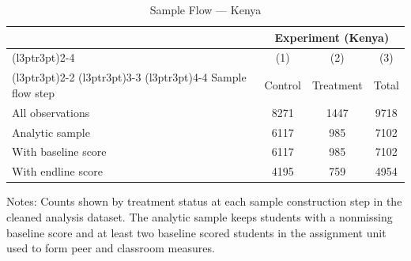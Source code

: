 \begin{table}[H]
\centering
\caption{Sample Flow --- Kenya}
\label{tab:ke_sampleflow}
\begin{threeparttable}
\begin{tabular}[t]{lccc}
\toprule
\multicolumn{1}{c}{ } & \multicolumn{3}{c}{Experiment (Kenya)} \\
\cmidrule(l{3pt}r{3pt}){2-4}
\multicolumn{1}{c}{ } & \multicolumn{1}{c}{(1)} & \multicolumn{1}{c}{(2)} & \multicolumn{1}{c}{(3)} \\
\cmidrule(l{3pt}r{3pt}){2-2} \cmidrule(l{3pt}r{3pt}){3-3} \cmidrule(l{3pt}r{3pt}){4-4}
Sample flow step & Control & Treatment & Total \\
\midrule
All observations & 8271 & 1447 & 9718 \\
Analytic sample & 6117 & 985 & 7102 \\
With baseline score & 6117 & 985 & 7102 \\
With endline score & 4195 & 759 & 4954 \\
\bottomrule
\end{tabular}
\begin{tablenotes}[para]
\item Notes: Counts shown by treatment status at each sample construction step in the cleaned analysis dataset. The analytic sample keeps students with a nonmissing baseline score and at least two baseline scored students in the assignment unit used to form peer and classroom measures.
\end{tablenotes}
\end{threeparttable}
\end{table}
